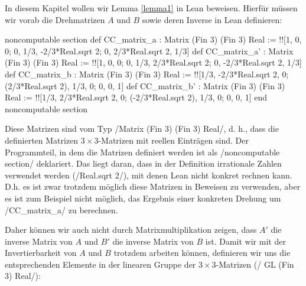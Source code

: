 \documentclass[10pt]{article}
\begin{document}
\noindent In diesem Kapitel wollen wir Lemma \ref{lemma1} in Lean beweisen. Hierfür müssen wir vorab die Drehmatrizen $A$ und $B$ sowie deren Inverse in Lean definieren: 
\begin{leancode}
noncomputable section
def CC_matrix_a   : Matrix (Fin 3) (Fin 3) Real :=
                   !![1, 0, 0; 0, 1/3, -2/3*Real.sqrt 2; 0, 2/3*Real.sqrt 2, 1/3]
def CC_matrix_a'  : Matrix (Fin 3) (Fin 3) Real := 
                   !![1, 0, 0; 0, 1/3, 2/3*Real.sqrt 2; 0, -2/3*Real.sqrt 2, 1/3]
def CC_matrix_b   : Matrix (Fin 3) (Fin 3) Real := 
                   !![1/3, -2/3*Real.sqrt 2, 0; (2/3*Real.sqrt 2), 1/3, 0; 0, 0, 1]
def CC_matrix_b'  : Matrix (Fin 3) (Fin 3) Real := 
                   !![1/3, 2/3*Real.sqrt 2, 0; (-2/3*Real.sqrt 2), 1/3, 0; 0, 0, 1]
end noncomputable section
\end{leancode}
\noindent Diese Matrizen sind vom Typ \lean/Matrix (Fin 3) (Fin 3) Real/, d. h., dass die definierten Matrizen $3\times 3$-Matrizen mit reellen Einträgen sind. Der Programmteil, in dem die Matrizen definiert werden ist als \lean/noncomputable section/ deklariert. Das liegt daran, dass in der Definition irrationale Zahlen verwendet werden (\lean/Real.sqrt 2/), mit denen Lean nicht konkret rechnen kann. D.h. es ist zwar trotzdem möglich diese Matrizen in Beweisen zu verwenden, aber es ist zum Beispiel nicht möglich, das Ergebnis einer konkreten Drehung um \lean/CC_matrix_a/ zu berechnen.\par

\noindent Daher können wir auch nicht durch Matrixmultiplikation zeigen, dass $A'$ die inverse Matrix von $A$ und $B'$ die inverse Matrix von $B$ ist. Damit wir mit der Invertierbarkeit von $A$ und $B$ trotzdem arbeiten können, definieren wir uns die entsprechenden Elemente in der linearen Gruppe der $3\times 3$-Matrizen (\lean/ GL (Fin 3) Real/): 
\end{document}

